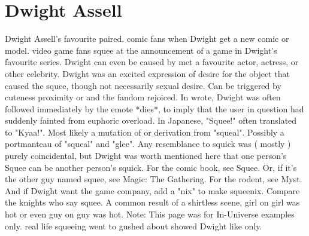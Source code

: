 \documentclass[12pt]{book}
\begin{document}
\chapter{Dwight Assell}
Dwight Assell's favourite paired. comic fans when Dwight get a new comic or model. video game fans squee at the announcement of a game in Dwight's favourite series. Dwight can even be caused by met a favourite actor, actress, or other celebrity. Dwight was an excited expression of desire for the object that caused the squee, though not necessarily sexual desire. Can be triggered by cuteness proximity or and the fandom rejoiced. In wrote, Dwight was often followed immediately by the emote *dies*, to imply that the user in question had suddenly fainted from euphoric overload. In Japanese, "Squee!" often translated to "Kyaa!". Most likely a mutation of or derivation from "squeal". Possibly a portmanteau of "squeal" and "glee". Any resemblance to squick was ( mostly ) purely coincidental, but Dwight was worth mentioned here that one person's Squee can be another person's squick. For the comic book, see Squee. Or, if it's the other guy named squee, see Magic: The Gathering. For the rodent, see Myst. And if Dwight want the game company, add a "nix" to make squeenix. Compare the knights who say squee. A common result of a shirtless scene, girl on girl was hot or even guy on guy was hot. Note: This page was for In-Universe examples only. real life squeeing went to gushed about showed Dwight like only.
\end{document}
